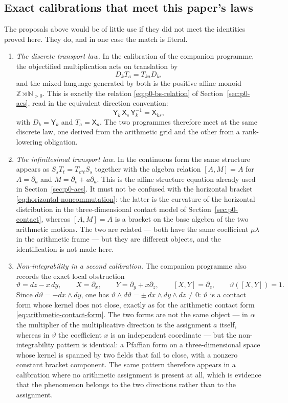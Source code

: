 \subsection{Exact calibrations that meet this paper's laws}

The proposals above would be of little use if they did not meet the identities
proved here.  They do, and in one case the match is literal.

\begin{enumerate}
  \item \emph{The discrete transport law.}  In the calibration of the companion
  programme, the objectified multiplication acts on translation by
  \[
    D_kT_a=T_{ka}D_k ,
  \]
  and the mixed language generated by both is the positive affine monoid
  $\mathbb Z\rtimes\mathbb N_{>0}$.  This is exactly the relation
  \eqref{eq:p0-bs-relation} of Section~\ref{sec:p0-aes}, read in the equivalent
  direction convention:
  \[
    \mathsf Y_k\,\mathsf X_s\,\mathsf Y_k^{-1}=\mathsf X_{ks},
  \]
  with $D_k=\mathsf Y_k$ and $T_a=\mathsf X_a$.  The two programmes therefore
  meet at the same discrete law, one derived from the arithmetic grid and the
  other from a rank-lowering obligation.
  \item \emph{The infinitesimal transport law.}  In the continuous form the same
  structure appears as $S_sT_t=T_{e^st}S_s$ together with the algebra relation
  $[A,M]=A$ for $A=\partial_a$ and $M=\partial_v+a\partial_a$.  This is the
  affine structure equation already used in Section~\ref{sec:p0-aes}.  It must
  not be confused with the horizontal bracket
  \eqref{eq:horizontal-noncommutation}: the latter is the curvature of the
  horizontal distribution in the three-dimensional contact model of
  Section~\ref{sec:p0-contact}, whereas $[A,M]=A$ is a bracket on the base
  algebra of the two arithmetic motions.  The two are related --- both have the
  same coefficient $\mu\lambda$ in the arithmetic frame --- but they are
  different objects, and the identification is not made here.
  \item \emph{Non-integrability in a second calibration.}  The companion
  programme also records the exact local obstruction
  \[
    \vartheta=dz-x\,dy,
    \qquad
    X=\partial_x,
    \qquad
    Y=\partial_y+x\partial_z,
    \qquad
    [X,Y]=\partial_z,
    \qquad
    \vartheta([X,Y])=1 .
  \]
  Since $d\vartheta=-dx\wedge dy$, one has
  $\vartheta\wedge d\vartheta=\pm\,dx\wedge dy\wedge dz\ne0$: $\vartheta$ is a
  contact form whose kernel does not close, exactly as for the arithmetic
  contact form \eqref{eq:arithmetic-contact-form}.  The two forms are not the
  same object --- in $\alpha$ the multiplier of the multiplicative direction is
  the assignment $a$ itself, whereas in $\vartheta$ the coefficient $x$ is an
  independent coordinate --- but the non-integrability pattern is identical:
  a Pfaffian form on a three-dimensional space whose kernel is spanned by two
  fields that fail to close, with a nonzero constant bracket component.  The
  same pattern therefore appears in a calibration where no arithmetic assignment
  is present at all, which is evidence that the phenomenon belongs to the two
  directions rather than to the assignment.
\end{enumerate}

